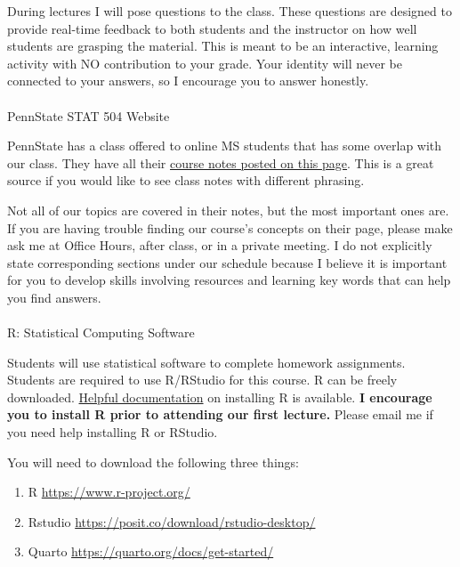 \documentclass[
  letterpaper,
  DIV=11,
  numbers=noendperiod]{scrartcl}
\makeatletter
\let\oldparagraph\paragraph
\renewcommand{\paragraph}{
    \@ifstar
      \xxxParagraphStar
      \xxxParagraphNoStar
  }
\newcommand{\xxxParagraphStar}[1]{\oldparagraph*{#1}\mbox{}}
\newcommand{\xxxParagraphNoStar}[1]{\oldparagraph{#1}\mbox{}}
\makeatother
\begin{document}
During lectures I will pose questions to the class. These questions are
designed to provide real-time feedback to both students and the
instructor on how well students are grasping the material. This is meant
to be an interactive, learning activity with NO contribution to your
grade. Your identity will never be connected to your answers, so I
encourage you to answer honestly.

\paragraph{PennState STAT 504 Website}\label{pennstate-stat-504-website}

PennState has a class offered to online MS students that has some
overlap with our class. They have all their
\href{https://online.stat.psu.edu/stat504/lesson/welcome-stat-504}{course
notes posted on this page}. This is a great source if you would like to
see class notes with different phrasing.

Not all of our topics are covered in their notes, but the most important
ones are. If you are having trouble finding our course's concepts on
their page, please make ask me at Office Hours, after class, or in a
private meeting. I do not explicitly state corresponding sections under
our schedule because I believe it is important for you to develop skills
involving resources and learning key words that can help you find
answers.~

\paragraph{R: Statistical Computing
Software}\label{r-statistical-computing-software}

Students will use statistical software to complete homework assignments.
Students are required to use R/RStudio for this course. R can be freely
downloaded.
\href{https://rstudio-education.github.io/hopr/starting.html}{Helpful
documentation} on installing R is available. \textbf{I encourage you to
install R prior to attending our first lecture.} Please email me if you
need help installing R or RStudio.

You will need to download the following three things:

\begin{enumerate}
\def\labelenumi{\arabic{enumi}.}
\item
  R \url{https://www.r-project.org/}
\item
  Rstudio \url{https://posit.co/download/rstudio-desktop/}
\item
  Quarto \url{https://quarto.org/docs/get-started/}
\end{enumerate}
\end{document}
